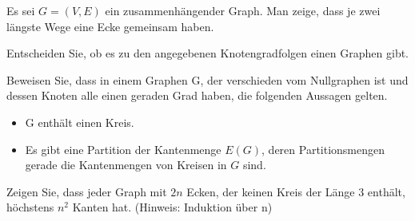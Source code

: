 \documentclass[10pt, a4paper]{exam}
\begin{document}
\begin{questions}
    \question Es sei $G=(V,E)$ ein zusammenhängender Graph. Man zeige, dass je zwei längste Wege eine Ecke gemeinsam haben.
    \begin{solution}
    \end{solution}

    \question Entscheiden Sie, ob es zu den angegebenen Knotengradfolgen einen Graphen gibt.

    \question Beweisen Sie, dass in einem Graphen G, der verschieden vom Nullgraphen ist und dessen Knoten alle einen geraden Grad haben, die folgenden Aussagen gelten.
    \begin{itemize}
        \item G enthält einen Kreis.
        \item Es gibt eine Partition der Kantenmenge $E(G)$, deren Partitionsmengen gerade die Kantenmengen von Kreisen in $G$ sind.
    \end{itemize}
    \begin{solution}
    \end{solution}

    \question Zeigen Sie, dass jeder Graph mit $2n$ Ecken, der keinen Kreis der Länge 3 enthält, höchstens $n^2$ Kanten hat. (Hinweis: Induktion über n)
    \begin{solution}
    \end{solution}

\end{questions}
\end{document}
